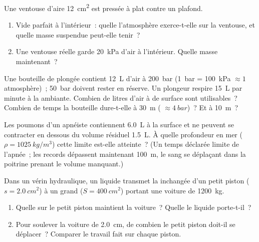 \begin{exercise}[$\star\star\star$]\label{exo:g10:pressure:12}
Une ventouse d'aire \qty{12}{cm^2} est pressée à plat contre un plafond.
\begin{enumerate}
  \item Vide parfait à l'intérieur~: quelle  l'atmosphère
        exerce-t-elle sur la ventouse, et quelle masse suspendue peut-elle
        tenir~?
  \item Une ventouse réelle garde \qty{20}{kPa} d'air à l'intérieur.
        Quelle masse maintenant~?
\end{enumerate}
\end{exercise}

\begin{exercise}[$\star\star\star$]\label{exo:g10:pressure:13}
Une bouteille de plongée contient \qty{12}{L} d'air à \qty{200}{bar}
(\qty{1}{bar} = \qty{100}{kPa} $\approx 1$ atmosphère)~;
\qty{50}{bar} doivent rester en réserve. Un plongeur respire
\qty{15}{L} par minute à la  ambiante. Combien de
litres d'air à  de surface sont utilisables~? Combien
de temps la bouteille dure-t-elle à \qty{30}{m}
( $\approx \qty{4}{bar}$)~? Et à
\qty{10}{m}~?
\end{exercise}

\begin{exercise}[$\star\star\star$]\label{exo:g10:pressure:14}
Les poumons d'un apnéiste contiennent \qty{6.0}{L} à la surface et ne
peuvent se contracter en dessous du volume résiduel \qty{1.5}{L}. À
quelle profondeur en mer ($\rho = \qty{1025}{kg/m^3}$) cette limite
est-elle atteinte~? (Un temps déclarée limite de l'apnée~; les records
dépassent maintenant \qty{100}{m}, le sang se déplaçant dans la
poitrine prenant le volume manquant.)
\end{exercise}

\begin{exercise}[$\star\star\star$]\label{exo:g10:pressure:15}
Dans un vérin hydraulique, un liquide transmet la
 inchangée d'un petit piston
($s = \qty{2.0}{cm^2}$) à un grand ($S = \qty{400}{cm^2}$) portant
une voiture de \qty{1200}{kg}.
\begin{enumerate}
  \item Quelle  sur le petit piston maintient la voiture~?
        Quelle  le liquide porte-t-il~?
  \item Pour soulever la voiture de \qty{2.0}{cm}, de combien le petit
        piston doit-il se déplacer~? Comparer le travail fait sur chaque
        piston.
\end{enumerate}
\end{exercise}

